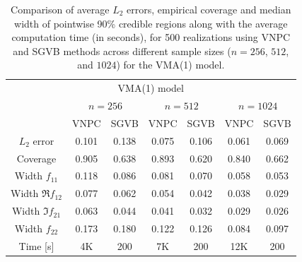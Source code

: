 \documentclass[%
 reprint,
 amsmath,amssymb,
 aps,
 nofootinbib,
]{revtex4-2}
\begin{document}
\begin{table}[h]
\centering
\begin{tabular}{ccccccc}
\hline
\multicolumn{7}{c}{VMA(1) model}\\
\quad & \multicolumn{2}{c}{$n=256$}  & \multicolumn{2}{c}{$n = 512$}  & \multicolumn{2}{c}{$n = 1024$}\\
\hline
\quad & {VNPC} & {SGVB} & {VNPC} & {SGVB} & {VNPC} & {SGVB}\\
{$L_2$ error} & 0.101 & 0.138 & 0.075 & 0.106 & 0.061 & 0.069\\
{Coverage} & 0.905 & 0.638 & 0.893 & 0.620 & 0.840 & 0.662\\
{Width $f_{11}$} & 0.118 & 0.086 & 0.081 & 0.070 & 0.058 & 0.053\\
{Width $\Re f_{12}$} & 0.077 & 0.062 & 0.054 & 0.042 & 0.038 & 0.029\\
{Width $\Im f_{21}$} & 0.063 & 0.044 & 0.041 & 0.032 & 0.029 & 0.026\\
{Width $f_{22}$} & 0.173 & 0.180 & 0.122 & 0.126 & 0.084 & 0.097\\
{Time [s]} & 4{\rm K} & 200 & 7{\rm K} & 200 & 12{\rm K} & 200 \hspace{-.5em} \\
\hline
\end{tabular}
\caption{{\small Comparison of average $L_2$ errors, empirical coverage and median width of pointwise 90\%
credible regions along with the average computation time (in seconds), for 500 realizations using VNPC and \ac{SGVB} methods across different sample sizes ($n=256$, $512$, and $1024$) for the VMA(1) model.}}
\label{table l1l2 vma1} 
\end{table}
\endgroup
\end{document}
